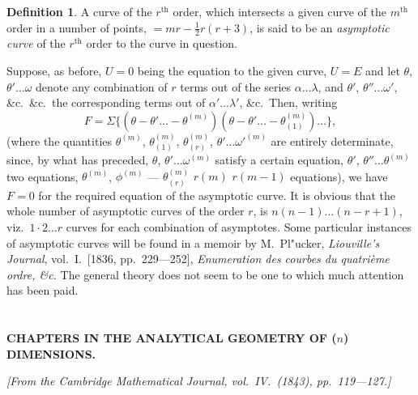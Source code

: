 \documentclass[11pt,a4paper]{article}
\theoremstyle{plain}
\theoremstyle{definition}
\newtheorem{definition}{Definition}
\theoremstyle{remark}
\begin{document}
\begin{definition}
A curve of the $r^{\text{th}}$ order, which intersects a given curve of the
$m^{\text{th}}$ order in a number of points, $= mr - \tfrac{1}{2}r(r+3)$, is said to be an \textit{asymptotic curve}
of the $r^{\text{th}}$ order to the curve in question.
\end{definition}

Suppose, as before, $U=0$ being the equation to the given curve, $U=E$ and let
$\theta$, $\theta' \ldots \omega$ denote any combination of $r$ terms out of the series $\alpha \ldots \lambda$, and $\theta'$, $\theta'' \ldots \omega'$,
\&c.\ \&c.\ the corresponding terms out of $\alpha' \ldots \lambda'$, \&c.\ Then, writing
\[
F = \Sigma\{(\theta - \theta' \ldots - \theta^{(m)})(\theta - \theta' \ldots - \theta^{(m)}_{(1)}) \ldots\},
\]
(where the quantities $\theta^{(m)}$, $\theta^{(m)}_{(1)}$, $\theta^{(m)}_{(r)}$, $\theta' \ldots \omega'^{(m)}$ are entirely determinate, since, by
what has preceded, $\theta$, $\theta' \ldots \omega^{(m)}$ satisfy a certain equation, $\theta'$, $\theta'' \ldots \theta^{(m)}$ two equations,
$\theta^{(m)}$, $\phi^{(m)}$ --- $\theta^{(m)}_{(r)}$ $r(m)$ $r(m-1)$ equations), we have $F=0$ for the required equation of the
asymptotic curve. It is obvious that the whole number of asymptotic curves of the
order $r$, is $n(n-1) \ldots (n-r+1)$, viz.\ $1 \cdot 2 \ldots r$ curves for each combination of
asymptotes. Some particular instances of asymptotic curves will
be found in a memoir by M.~Pl"{u}cker, \textit{Liouville's Journal}, vol.~I.\ [1836, pp.~229---252],
\textit{Enumeration des courbes du quatri\`{e}me ordre, \&c.} The general theory does not seem to
be one to which much attention has been paid.

\newpage
\setcounter{section}{10}


\section{}
\begin{center}
\textbf{CHAPTERS IN THE ANALYTICAL GEOMETRY OF ($n$) DIMENSIONS.}
\end{center}
\textit{[From the Cambridge Mathematical Journal, vol.\ IV.\ (1843), pp.\ 119---127.]}
\end{document}

